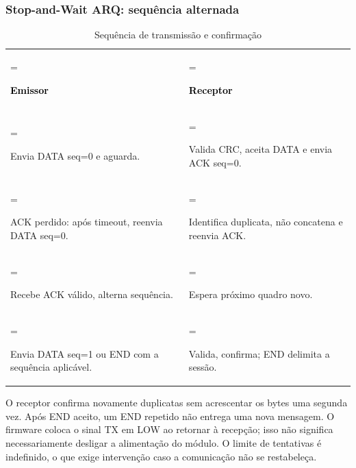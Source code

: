 \subsubsection*{Stop-and-Wait ARQ: sequência alternada}
\begin{table}[H]\centering\small\caption{Sequência de transmissão e confirmação}\label{tab:11}
\begin{tabularx}{\linewidth}{>{\hsize=0.9979\hsize\linewidth=\hsize\raggedright\arraybackslash}X>{\hsize=1.0021\hsize\linewidth=\hsize\raggedright\arraybackslash}X}
\rowcolor{tcdtablehead} \textcolor{black}{\textbf{Emissor}} & \textcolor{black}{\textbf{Receptor}} \\
Envia DATA seq=0 e aguarda. & Valida CRC, aceita DATA e envia ACK seq=0. \\
ACK perdido: após timeout, reenvia DATA seq=0. & Identifica duplicata, não concatena e reenvia ACK. \\
Recebe ACK válido, alterna sequência. & Espera próximo quadro novo. \\
Envia DATA seq=1 ou END com a sequência aplicável. & Valida, confirma; END delimita a sessão. \\
\bottomrule\end{tabularx}\end{table}
O receptor confirma novamente duplicatas sem acrescentar os bytes uma segunda vez. Após END aceito, um END repetido não entrega uma nova mensagem. O firmware coloca o sinal TX em LOW ao retornar à recepção; isso não significa necessariamente desligar a alimentação do módulo. O limite de tentativas é indefinido, o que exige intervenção caso a comunicação não se restabeleça.

